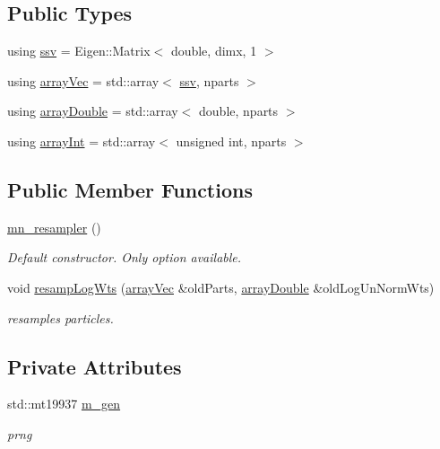 \subsection*{Public Types}
\begin{DoxyCompactItemize}
\item 
using \hyperlink{classmn__resampler_ae9b9c863c83ef47d10f66469f15c2277}{ssv} = Eigen\+::\+Matrix$<$ double, dimx, 1 $>$
\item 
using \hyperlink{classmn__resampler_af39a099d2ae642d229cb4ec20385193e}{array\+Vec} = std\+::array$<$ \hyperlink{classrbase_a78cdecb1ac67ffdaee90be7709c961e4}{ssv}, nparts $>$
\item 
using \hyperlink{classmn__resampler_a42c1ad632e0bcc40df749e370aa4c301}{array\+Double} = std\+::array$<$ double, nparts $>$
\item 
using \hyperlink{classmn__resampler_a37074929b181708729008b6fd798626f}{array\+Int} = std\+::array$<$ unsigned int, nparts $>$
\end{DoxyCompactItemize}
\subsection*{Public Member Functions}
\begin{DoxyCompactItemize}
\item 
\hyperlink{classmn__resampler_ac9dc07a64fdd14485c04cd5dd7a7c84a}{mn\+\_\+resampler} ()\hypertarget{classmn__resampler_ac9dc07a64fdd14485c04cd5dd7a7c84a}{}\label{classmn__resampler_ac9dc07a64fdd14485c04cd5dd7a7c84a}

\begin{DoxyCompactList}\small\item\em Default constructor. Only option available. \end{DoxyCompactList}\item 
void \hyperlink{classmn__resampler_af36489e85dc03eab972b692d860fc420}{resamp\+Log\+Wts} (\hyperlink{classrbase_a428b9f0dd8712a93c096baaf6ab74d8c}{array\+Vec} \&old\+Parts, \hyperlink{classrbase_ab1b61e00a2e0783d9b414118d912427e}{array\+Double} \&old\+Log\+Un\+Norm\+Wts)
\begin{DoxyCompactList}\small\item\em resamples particles. \end{DoxyCompactList}\end{DoxyCompactItemize}
\subsection*{Private Attributes}
\begin{DoxyCompactItemize}
\item 
std\+::mt19937 \hyperlink{classmn__resampler_af3ce5420d54ac17492132d78056c06ea}{m\+\_\+gen}\hypertarget{classmn__resampler_af3ce5420d54ac17492132d78056c06ea}{}\label{classmn__resampler_af3ce5420d54ac17492132d78056c06ea}

\begin{DoxyCompactList}\small\item\em prng \end{DoxyCompactList}\end{DoxyCompactItemize}


